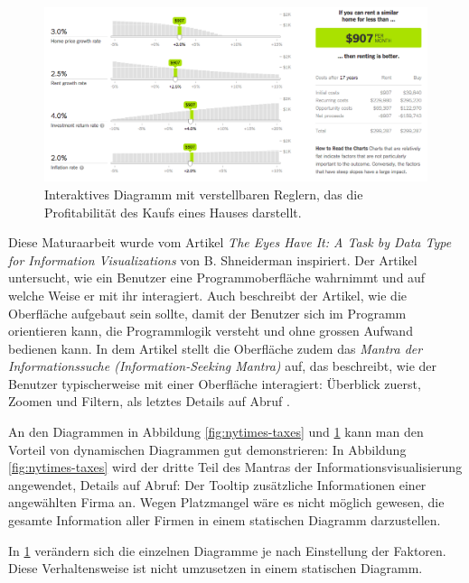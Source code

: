 \begin{figure}[!htbp]
	\centering
	\includegraphics[width=\linewidth]{images/nytimes-realestate-zugeschnitten}
	\caption[Interaktives Diagramm in The New York Times]{Interaktives Diagramm mit verstellbaren Reglern, das die Profitabilität des Kaufs eines Hauses darstellt. \cite{nytimes-realestate}}
	\label{fig:nytimes-realestate}
\end{figure}


Diese Maturaarbeit wurde vom Artikel \textit{The Eyes Have It: A Task by Data Type for Information Visualizations} von B. Shneiderman \cite{shneiderman} inspiriert. Der Artikel untersucht, wie ein Benutzer eine Programmoberfläche wahrnimmt und auf welche Weise er mit ihr interagiert. Auch beschreibt der Artikel, wie die Oberfläche aufgebaut sein sollte, damit der Benutzer sich im Programm orientieren kann, die Programmlogik versteht und ohne grossen Aufwand bedienen kann. In dem Artikel stellt die Oberfläche zudem das \textit{Mantra der Informationssuche (Information-Seeking Mantra)} auf, das beschreibt, wie der Benutzer typischerweise mit einer Oberfläche interagiert: Überblick zuerst, Zoomen und Filtern, als letztes Details auf Abruf \cite{shneiderman}.

An den Diagrammen in Abbildung \ref{fig:nytimes-taxes} und \ref{fig:nytimes-realestate} kann man den Vorteil von dynamischen Diagrammen gut demonstrieren: In Abbildung \ref{fig:nytimes-taxes} wird der dritte Teil des Mantras der Informationsvisualisierung angewendet, Details auf Abruf: Der Tooltip zusätzliche Informationen einer angewählten Firma an. Wegen Platzmangel wäre es nicht möglich gewesen, die gesamte Information aller Firmen in einem statischen Diagramm darzustellen.

In \ref{fig:nytimes-realestate} verändern sich die einzelnen Diagramme je nach Einstellung der Faktoren. Diese Verhaltensweise ist nicht umzusetzen in einem statischen Diagramm.

